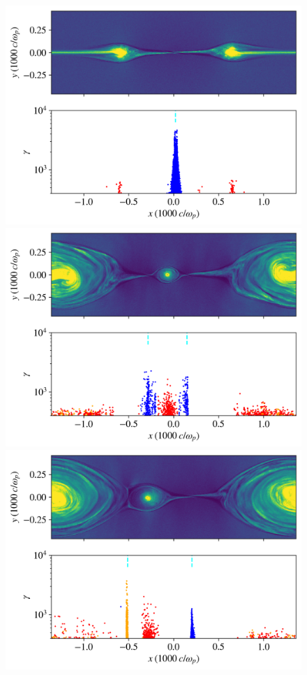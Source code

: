 \documentclass[iop,twocolappendix]{emulateapj}
\begin{document}
\begin{figure}[htp]
	{
		\includegraphics[width=\linewidth]{triggered_bguide_snapshot10.png}
	}
	\newline
	{
		\includegraphics[width=\linewidth]{triggered_bguide_snapshot35.png}
	}
	\newline
	{
		\includegraphics[width=\linewidth]{triggered_bguide_snapshot45.png}
	}
	

\end{figure}
\end{document}
